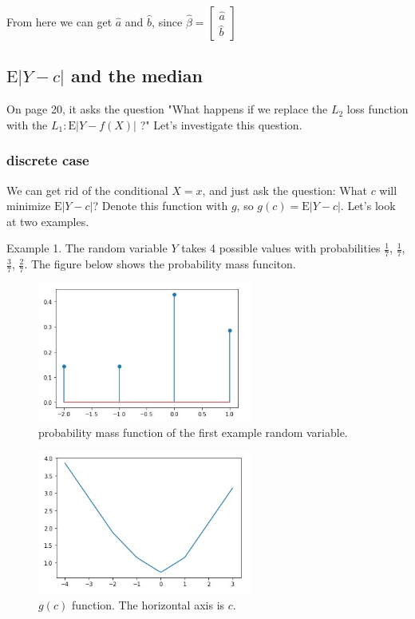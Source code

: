 \documentclass{article}
\begin{document}
From here we can get $\hat{a}$ and $\hat{b}$, since $\hat{\beta} = \begin{bmatrix} \hat{a} \\ \hat{b} \end{bmatrix}$

\newpage
\subsection{$\text{E}|Y - c|$ and the median}

On page 20, it asks the question "What happens if we replace the $L_2$ loss function with the $L_1: \text{E}|Y-f(X)|$ ?" Let's investigate this question.

\subsubsection{discrete case}

We can get rid of the conditional $X=x$, and just ask the question: What $c$ will minimize $\text{E}|Y-c|$? Denote this function with $g$,  so $g(c) = \text{E}|Y-c|$. Let's look at two examples.

Example 1. The random variable $Y$ takes 4 possible values with probabilities $\frac 17$, $\frac 17$, $\frac 37$, $\frac 27$. The figure below shows the probability mass funciton.

\begin{figure}[ht]
 \centering
  \includegraphics[width=200pt]{images/rnd1}
 \caption{probability mass function of the first example random variable.}
\end{figure}

\begin{figure}[ht]
 \centering
  \includegraphics[width=200pt]{images/rnd_func1}
 \caption{$g(c)$ function. The horizontal axis is $c$.}
\end{figure}
\end{document}
